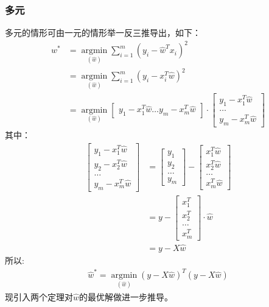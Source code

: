 \documentclass[cn,hazy,blue,14pt,normal]{elegantnote}
\begin{document}
\subsubsection{多元}
多元的情形可由一元的情形举一反三推导出，如下：
\begin{align}
  w^*&=\mathop{\arg\min}\limits_{(\hat{w})}\sum_{i=1}^{m}{(y_i-\hat{w}^Tx_i)^2} \nonumber\\ &=\mathop{\arg\min}\limits_{(\hat{w})}\sum_{i=1}^{m}{(y_i-x_i^T\hat{w})^2} \nonumber \\ &=\mathop{\arg\min}\limits_{(\hat{w})}\begin{bmatrix}y_1-x_1^T\hat{w}\dots y_m-x_m^T\hat{w}\end{bmatrix} \cdot \begin{bmatrix}y_1-x_1^T\hat{w} \\ \dots \\ y_m-x_m^T\hat{w}\end{bmatrix}
\end{align}
其中：
\begin{align}
  \begin{bmatrix}y_1-x_1^T\hat{w} \\ y_2-x_2^T\hat{w} \\\dots \\ y_m-x_m^T\hat{w}\end{bmatrix}&=\begin{bmatrix}y_1\\ y_2\\ \dots\\ y_m\end{bmatrix} - \begin{bmatrix}x_1^T\hat{w}\\ x_2^T\hat{w} \\ \dots\\ x_m^T\hat{w}\end{bmatrix} \nonumber \\ &=y-\begin{bmatrix}x_1^T \\ x_2^T \\ \dots \\ x_m^T\end{bmatrix}\cdot \hat{w} \nonumber \\ &= y-X\hat{w} 
\end{align} 
所以:
\begin{align}\hat{w}^*=\mathop{\arg\min}\limits_{(\hat{w})}(y-X\hat{w})^T(y-X\hat{w})\end{align}
现引入两个定理对$\hat{w}$的最优解做进一步推导。
\end{document}
